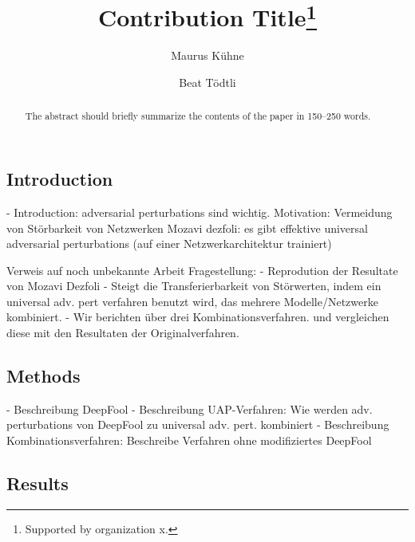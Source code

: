 \documentclass[runningheads]{llncs}
\begin{document}
%
\title{Contribution Title\thanks{Supported by organization x.}}
%
%
\author{Maurus K\"uhne \and
Beat Tödtli} %
%
%
%
\maketitle              %
%
\begin{abstract}
The abstract should briefly summarize the contents of the paper in
150--250 words.
\cite{yu_generating_2018}
\end{abstract}
%
%
%
\subsection{Introduction}
- Introduction: adversarial perturbations sind wichtig. 
  Motivation: Vermeidung von Störbarkeit von Netzwerken
	Mozavi dezfoli: es gibt effektive universal adversarial perturbations (auf einer Netzwerkarchitektur trainiert)
	
	Verweis auf noch unbekannte Arbeit
	Fragestellung:
		- Reprodution der Resultate von Mozavi Dezfoli
		- Steigt die Transferierbarkeit von Störwerten, indem ein universal adv. pert verfahren benutzt wird, das mehrere Modelle/Netzwerke kombiniert. 
		- Wir berichten über drei Kombinationsverfahren. und vergleichen diese mit den Resultaten der Originalverfahren.
\subsection{Methods}
- Beschreibung DeepFool
- Beschreibung UAP-Verfahren: Wie werden adv. perturbations von DeepFool zu universal adv. pert. kombiniert
- Beschreibung Kombinationsverfahren: Beschreibe Verfahren ohne modifiziertes DeepFool
\subsection{Results}
\end{document}
